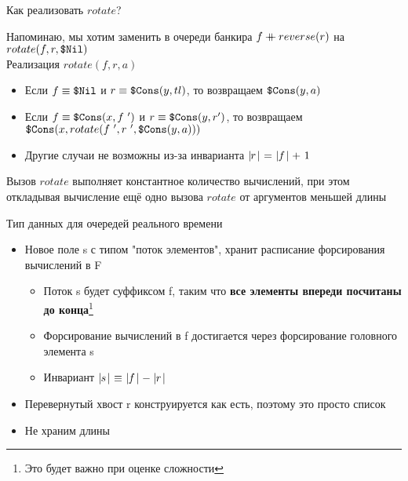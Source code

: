 \begin{frame}{Как реализовать $rotate$?}

Напоминаю, мы хотим заменить в очереди банкира $f\mathbin{+\mkern-10mu+} reverse(r)$ на $rotate(f,r,\texttt{\$Nil})$\\

Реализация $rotate(f,r,a)$
\begin{itemize}
\item Если $f\equiv\texttt{\$Nil}$ и $r\equiv\texttt{\$Cons}(y,tl)$, то возвращаем $\texttt{\$Cons}(y,a)$
\item Если $f\equiv\texttt{\$Cons}(x,f\ ')$ и $r\equiv\texttt{\$Cons}(y,r')$, то возвращаем $\texttt{\$Cons}(x,rotate(f\ ', r\ ', \texttt{\$Cons}(y,a)))$
\item Другие случаи не возможны из-за инварианта $\mid\!\!r\!\mid\ =\ \mid\!\!f\!\mid +\ 1$
\end{itemize}

\begin{remark}
Вызов $rotate$ выполняет константное количество вычислений, при этом откладывая вычисление ещё одно вызова $rotate$ от аргументов меньшей длины
\end{remark}
\end{frame}

\def\invariant{$\card{s}\ \equiv\ \card{f}-\card{r}$}
\def\rotate{\ensuremath{rotate}}

\begin{frame}[fragile]{Тип данных для очередей реального времени}


\begin{itemize}
\item Новое поле s с типом "поток элементов", хранит расписание форсирования вычислений в F
\begin{itemize}
\item Поток s будет суффиксом f, таким что \textbf{все элементы впереди посчитаны до конца}\footnote{Это будет важно при оценке сложности}
\item Форсирование вычислений в f достигается через форсирование головного элемента s
\item Инвариант \invariant
\end{itemize}
\item Перевернутый хвост r конструируется как есть, поэтому это просто список
\item Не храним длины
\end{itemize}
\end{frame}

